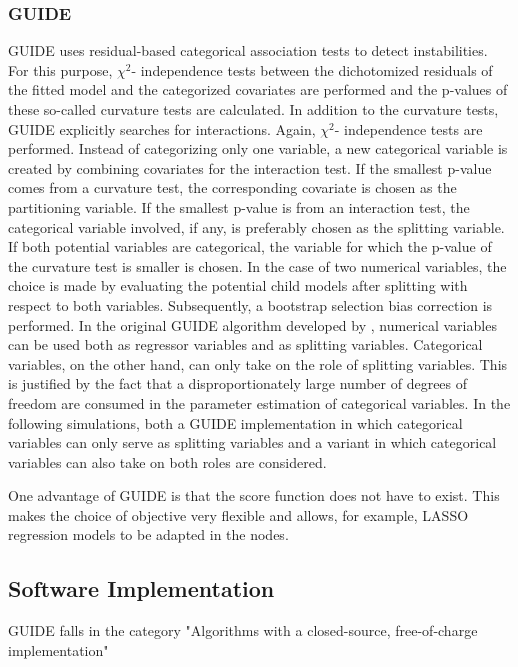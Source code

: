 \subsubsection{GUIDE}
GUIDE \citep{.2002} uses residual-based categorical association tests to detect instabilities. For this purpose, $\chi^2$- independence tests between the dichotomized residuals of the fitted model and the categorized covariates are performed and the p-values of these so-called curvature tests are calculated. In addition to the curvature tests, GUIDE explicitly searches for interactions.  Again, $\chi^2$- independence tests are performed. Instead of categorizing only one variable, a new categorical variable is created by combining covariates for the interaction test. If the smallest p-value comes from a curvature test, the corresponding covariate is chosen as the partitioning variable. If the smallest p-value is from an interaction test, the categorical variable involved, if any, is preferably chosen as the splitting variable. If both potential variables are categorical, the variable for which the p-value of the curvature test is smaller is chosen. In the case of two numerical variables, the choice is made by evaluating the potential child models after splitting with respect to both variables.
Subsequently, a bootstrap selection bias correction is performed.
In the original GUIDE algorithm developed by \citep{.2002}, numerical variables can be used both as regressor variables and as splitting variables. Categorical variables, on the other hand, can only take on the role of splitting variables. This is justified by the fact that a disproportionately large number of degrees of freedom are consumed in the parameter estimation of categorical variables.
In the following simulations, both a GUIDE implementation in which categorical variables can only serve as splitting variables and a variant in which categorical variables can also take on both roles are considered. 

One advantage of GUIDE is that the score function does not have to exist. This makes the choice of objective very flexible and allows, for example, LASSO regression models to be adapted in the nodes.




\subsection{Software Implementation}
GUIDE falls in the category "Algorithms with a closed-source, free-of-charge implementation" \citep{Loh.2014}

